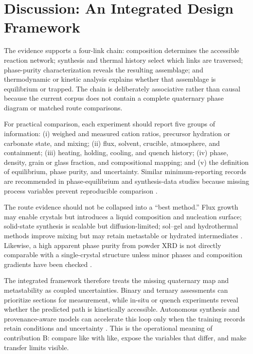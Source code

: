 \section{Discussion: An Integrated Design Framework}

The evidence supports a four-link chain: composition determines the accessible reaction network; synthesis and thermal history select which links are traversed; phase-purity characterization reveals the resulting assemblage; and thermodynamic or kinetic analysis explains whether that assemblage is equilibrium or trapped. The chain is deliberately associative rather than causal because the current corpus does not contain a complete quaternary phase diagram or matched route comparisons.

For practical comparison, each experiment should report five groups of information: (i) weighed and measured cation ratios, precursor hydration or carbonate state, and mixing; (ii) flux, solvent, crucible, atmosphere, and containment; (iii) heating, holding, cooling, and quench history; (iv) phase, density, grain or glass fraction, and compositional mapping; and (v) the definition of equilibrium, phase purity, and uncertainty. Similar minimum-reporting records are recommended in phase-equilibrium and synthesis-data studies because missing process variables prevent reproducible comparison \cite{wang2022dataset,zhang2026provmind,chen2024navigating,kim2025key}.

The route evidence should not be collapsed into a “best method.” Flux growth may enable crystals but introduces a liquid composition and nucleation surface; solid-state synthesis is scalable but diffusion-limited; sol--gel and hydrothermal methods improve mixing but may retain metastable or hydrated intermediates \cite{bugaris2012materials,kolitsch2006bay2si3o10,ranganathan2008sol,peng2016hydrothermal}. Likewise, a high apparent phase purity from powder XRD is not directly comparable with a single-crystal structure unless minor phases and composition gradients have been checked \cite{kim2025key,mckenzie2021nucleation,abdelhameed2023structural}.

The integrated framework therefore treats the missing quaternary map and metastability as coupled uncertainties. Binary and ternary assessments can prioritize sections for measurement, while in-situ or quench experiments reveal whether the predicted path is kinetically accessible. Autonomous synthesis and provenance-aware models can accelerate this loop only when the training records retain conditions and uncertainty \cite{szymanski2023an,chen2024navigating,zhang2026provmind,schlesinger2026thermodynamic}. This is the operational meaning of contribution B: compare like with like, expose the variables that differ, and make transfer limits visible.

